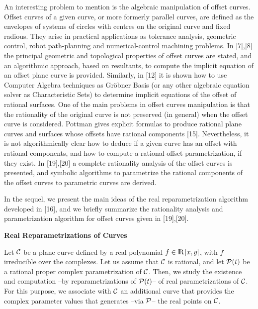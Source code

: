 An interesting problem to mention is the algebraic manipulation of offset  
curves. Offset curves of a given curve, or more formerly parallel curves, 
are defined as the envelopes of systems of circles with centres on the 
original curve and fixed radious. They  arise in practical applications 
as tolerance a\-na\-ly\-sis, geometric control, robot path-planning and 
numerical-control machining problems.  In [7],[8] the principal 
geometric and topological properties of offset curves are stated, and  
an algorithmic approach, based on resultants, to compute the implicit 
equation of an offset plane curve is provided. Similarly, in [12] it is 
shown how to use  Computer Algebra techniques as Gr\"obner Basis (or any 
other algebraic equation solver as Characteristic Sets)  to determine 
implicit equations of the offset of rational surfaces. One of the main 
problems in offset curves manipulation is that the rationality of the 
original curve is not preserved (in general) when the offset curve is 
considered. Pottman gives explicit formulas to produce rational plane 
curves and surfaces whose offsets have rational components [15]. 
Nevertheless, it is not algorithmically clear how to deduce if a given 
curve has an offset with  rational components, and how to compute a 
rational offset parametrization, if they exist. In [19],[20] a complete 
rationality analysis of the offset curves is presented, and symbolic 
algorithms to parametrize the rational components of the offset curves 
to parametric curves are derived. 

In the sequel, we present the main ideas of the real reparametrization 
algorithm developed in [16], and we briefly summarize the rationality 
analysis and parametrization algorithm for offset curves given in [19],[20].
\newpage
\begin{center}
{\bf Real Reparametrizations of Curves}
\end{center}
\vspace{1 mm}
Let ${\cal C}$ be a plane curve 
defined by a real polynomial $f \in {\rm I\kern -2.2pt R\hskip 1pt}[x,y]$, with $f$ irreducible 
over the complexes. Let us assume that ${\cal C}$ is rational, 
and let ${\cal P}(t)$ be a rational  proper complex 
parametrization of ${\cal C}$. Then, we study the existence 
and computation --by re\-pa\-ra\-me\-tri\-za\-tions of ${\cal P}(t)$-- 
of real parametrizations of ${\cal C}$.  For  this purpose, we associate 
with ${\cal C}$ an additional curve  that provides the complex parameter 
values that generates --via ${\cal P}$-- the real points on ${\cal C}$. 

